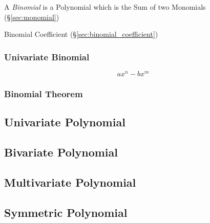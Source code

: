 A \emph{Binomial} is a Polynomial which is the Sum of two Monomials
(\S\ref{sec:monomial})

Binomial Coefficient (\S\ref{sec:binomial_coefficient})



\subsubsection{Univariate Binomial}\label{sec:univariate_binomial}

\[
  a x^n - b x^m
\]


\subsubsection{Binomial Theorem}\label{sec:binomial_theorem}



\subsection{Univariate Polynomial}\label{sec:univariate_polynomial}

\subsection{Bivariate Polynomial}\label{sec:bivariate_polynomial}

\subsection{Multivariate Polynomial}\label{sec:multivariate_polynomial}

\subsection{Symmetric Polynomial}\label{sec:symmetric_polynomial}

